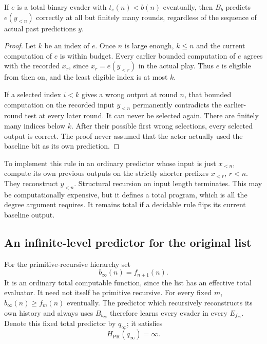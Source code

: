 \documentclass[11pt]{article}
\begin{document}
\begin{lemma}\label{lem:robust}
If $e$ is a total binary evader with $t_e(n)<b(n)$ eventually, then
$B_b$ predicts $e(y_{<n})$ correctly at all but finitely many rounds,
regardless of the sequence of actual past predictions $y$.
\end{lemma}
\begin{proof}
Let $k$ be an index of $e$. Once $n$ is large enough, $k\le n$ and
the current computation of $e$ is within budget. Every earlier
bounded computation of $e$ agrees with the recorded $x_r$, since
$x_r=e(y_{<r})$ in the actual play. Thus $e$ is eligible from then on,
and the least eligible index is at most $k$.

If a selected index $i<k$ gives a wrong output at round $n$, that
bounded computation on the recorded input $y_{<n}$ permanently
contradicts the earlier-round test at every later round. It can
never be selected again. There are finitely many indices below $k$.
After their possible first wrong selections, every selected output
is correct. The proof never assumed that the actor actually used
the baseline bit as its own prediction.
\end{proof}

To implement this rule in an ordinary predictor whose input is just
$x_{<n}$, compute its own previous outputs on the strictly shorter
prefixes $x_{<r}$, $r<n$. They reconstruct $y_{<n}$. Structural
recursion on input length terminates. This may be computationally
expensive, but it defines a total program, which is all the degree
argument requires. It remains total if a decidable rule flips its
current baseline output.

\subsection{An infinite-level predictor for the original list}

For the primitive-recursive hierarchy set
\[
 b_\infty(n)=f_{n+1}(n).
\]
It is an ordinary total computable function, since the list has an
effective total evaluator. It need not itself be primitive recursive.
For every fixed $m$, $b_\infty(n)\ge f_m(n)$ eventually. The predictor
which recursively reconstructs its own history and always uses
$B_{b_\infty}$ therefore learns every evader in every $E_{f_m}$.
Denote this fixed total predictor by $q_\infty$; it satisfies
\begin{equation}\label{eq:qinf}
 H_{\mathrm{PR}}(q_\infty)=\infty.
\end{equation}
\end{document}
